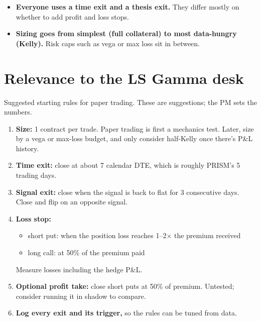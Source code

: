 \documentclass{article}
\begin{document}
\begin{itemize}

\item \textbf{Everyone uses a time exit and a thesis exit.} They differ mostly on whether to add profit and loss stops.

\item \textbf{Sizing goes from simplest (full collateral) to most data-hungry (Kelly).} Risk caps such as vega or max loss sit in between.

\end{itemize}

\section{Relevance to the LS Gamma desk}

Suggested starting rules for paper trading. These are suggestions; the PM sets the numbers.

\begin{enumerate}

\item \textbf{Size:} 1 contract per trade. Paper trading is first a mechanics test. Later, size by a vega or max-loss budget, and only consider half-Kelly once there's P\&L history.

\item \textbf{Time exit:} close at about 7 calendar DTE, which is roughly PRISM's 5 trading days.

\item \textbf{Signal exit:} close when the signal is back to flat for 3 consecutive days. Close and flip on an opposite signal.

\item \textbf{Loss stop:}

\begin{itemize}

\item short put: when the position loss reaches 1--2\ensuremath{\times} the premium received

\item long call: at 50\% of the premium paid

\end{itemize}

Measure losses including the hedge P\&L.

\item \textbf{Optional profit take:} close short puts at 50\% of premium. Untested; consider running it in shadow to compare.

\item \textbf{Log every exit and its trigger,} so the rules can be tuned from data.

\end{enumerate}
\end{document}
